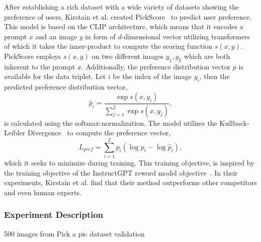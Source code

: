 After establishing a rich dataset with a wide variety of datasets showing the
preference of users, Kirstain et al. created PickScore~\cite{kirstain2023pickapic}
to predict user preference. This model is based on the CLIP architecture, which
means that it encodes a prompt $x$ and an image $y$ in form of $d$-dimensional
vector utilizing transformers of which it takes the inner-product to compute the scoring function
$s(x, y)$. PickScore employs $s(x, y)$ on two different images $y_1, y_2$ which
are both inherent to the prompt $x$. Additionally, the preference distribution
vector $p$ is available for the data triplet. Let $i$ be the index of the image
$y_i$, then the predicted preference distribution vector,
\begin{equation}
    \hat{p}_i = \frac{\exp s(x, y_i)}{\sum_{j=1}^{2}\exp s(x, y_j)},
\end{equation}
is calculated using the softmax-normalization. The model utilizes the
Kullback-Leibler Divergence~\cite{kullback1951OnInformationandSufficiency} to compute the preference vector,
\begin{equation}
    L_{pref} = \sum_{i=1}^{2} p_i (\log p_i - \log\hat{p}_i),
\end{equation}
which it seeks to minimize during training. This training objective, is inspired
by the training objective of the InstructGPT reword model
objective~\cite{Ouyang2024InstructGPT}. In their experiments, Kirstain et al.
find that their method outperforms other competitors and even human experts.

\subsubsection{Experiment Description}
500 images from Pick a pic dataset validation
